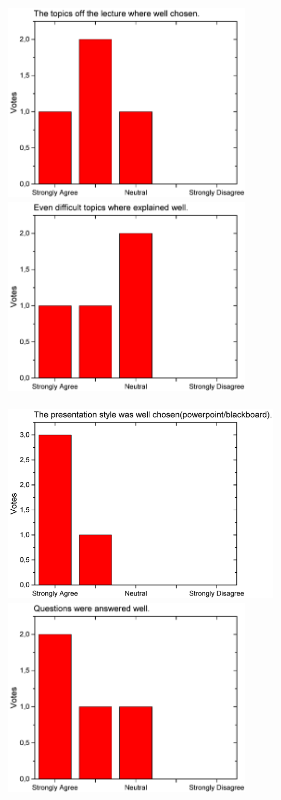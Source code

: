 \begin{figure}[H]
  \begin{minipage}{.48\linewidth}
    \centering
      {\includegraphics[height=50mm]{figures/n/Graph37.pdf}}
      {\includegraphics[height=50mm]{figures/n/Graph38.pdf}}
  \end{minipage}\quad
  \begin{minipage}{.48\linewidth}
    \centering
      {\includegraphics[height=50mm]{figures/n/Graph39.pdf}}
      {\includegraphics[height=50mm]{figures/n/Graph40.pdf}}
  \end{minipage}
\end{figure}
